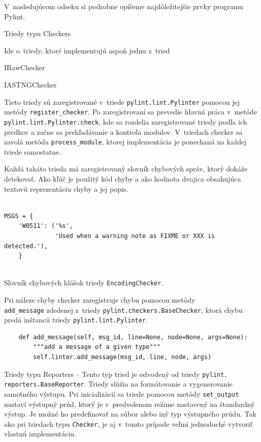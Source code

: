 \documentclass[11pt,oneside,final]{fithesis2}
\begin{document}
		V~nasledujúcom odseku si podrobne opíšeme najdôležitejšie prvky programu Pylint.
		
    \begin{list}{•}{}
		\item Triedy typu Checkers 
		
		Ide o~triedy, ktoré implementujú aspoň jednu z~tried
		
			    \begin{list}{•}{}
					\item IRawChecker
					\item IASTNGChecker
    			\end{list}		
		
		Tieto triedy sú zaregistrované v~triede \texttt{pylint.lint.Pylinter} pomocou jej metódy \texttt{register\_checker}.	Po zaregistrovaní sa prevedie hlavná práca v~metóde \texttt{pylint.lint.Pylinter.check}, kde sa rozdelia zaregistrované triedy podľa ich predkov a začne sa prehľadávanie a kontrola modulov. V~triedach checker sa zavolá metóda \texttt{process\_module}, ktorej implementácia je ponechaná na každej triede samostatne.
		
		Každá takáto trieda má zaregistrovaný slovník chybových správ, ktorý dokáže detekovať. Ako kľúč je použitý kód chyby a ako hodnota dvojica obsahujúca textovú reprezentáciu chyby a jej popis.

\begin{lstlisting}

MSGS = {
    'W0511': ('%s',
              'Used when a warning note as FIXME or XXX is detected.'),
    }
		
\end{lstlisting}		

Slovník chybových hlášok triedy \texttt{EncodingChecker}.


Pri náleze chyby checker zaregistruje chybu pomocou metódy \\\texttt{add\_message} zdedenej z~triedy \texttt{pylint.checkers.BaseChecker}, ktorá chybu predá inštancii triedy \texttt{pylint.lint.Pylinter}.

\begin{lstlisting}
    def add_message(self, msg_id, line=None, node=None, args=None):
        """add a message of a given type"""
        self.linter.add_message(msg_id, line, node, args)
\end{lstlisting}

	
		\item Triedy typu Reporters -- 
		Tento typ tried je odvodený od triedy \texttt{pylint.\\reporters.BaseReporter}. Triedy slúžia na formátovanie a vygenerovanie samotného výstupu. Pri inicializácií sa triede pomocou metódy \texttt{set\_output} nastaví výstupný prúd, ktorý je v~predvolenom režime nastavený na štandardný výstup. Je možné ho predefinovať na súbor alebo iný typ výstupného prúdu. Tak ako pri triedach typu \texttt{Checker}, je aj v~tomto prípade veľmi jednoduché vytvoriť vlastnú implementáciu.
		

\end{list}
\end{document}

